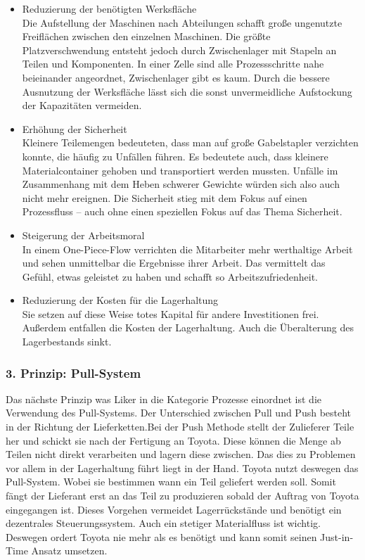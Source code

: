 \documentclass[a4paper,12pt]{scrartcl}
\begin{document}
\begin{itemize}
    \item Reduzierung der benötigten Werksfläche\\
    Die Aufstellung der Maschinen nach Abteilungen schafft große ungenutzte Freiflächen zwischen den einzelnen Maschinen. Die größte Platzverschwendung entsteht jedoch durch Zwischenlager mit Stapeln an Teilen und Komponenten. In einer Zelle sind alle Prozessschritte nahe beieinander angeordnet, Zwischenlager gibt es kaum. Durch die bessere Ausnutzung der Werksfläche lässt sich die sonst unvermeidliche Aufstockung der Kapazitäten vermeiden.
    \item Erhöhung der Sicherheit\\
    Kleinere Teilemengen bedeuteten, dass man auf große Gabelstapler verzichten konnte, die häufig zu Unfällen führen. Es bedeutete auch, dass kleinere Materialcontainer gehoben und transportiert werden mussten. Unfälle im Zusammenhang mit dem Heben schwerer Gewichte würden sich also auch nicht mehr ereignen. Die Sicherheit stieg mit dem Fokus auf einen Prozessfluss – auch ohne einen speziellen Fokus auf das Thema Sicherheit.
    \item Steigerung der Arbeitsmoral\\
    In einem One-Piece-Flow verrichten die Mitarbeiter mehr werthaltige Arbeit und sehen unmittelbar die Ergebnisse ihrer Arbeit. Das vermittelt das Gefühl, etwas geleistet zu haben und schafft so Arbeitszufriedenheit.
    \item Reduzierung der Kosten für die Lagerhaltung\\
    Sie setzen auf diese Weise totes Kapital für andere Investitionen frei. Außerdem entfallen die Kosten der Lagerhaltung. Auch die Überalterung des Lagerbestands sinkt.
\end{itemize}

\subsubsection{3. Prinzip: Pull-System}

Das nächste Prinzip was Liker in die Kategorie Prozesse einordnet ist die Verwendung des Pull-Systems. Der Unterschied zwischen Pull und Push besteht in der Richtung der Lieferketten.Bei der Push Methode stellt der Zulieferer Teile her und schickt sie nach der Fertigung an Toyota. Diese können die Menge ab Teilen nicht direkt verarbeiten und lagern diese zwischen. Das dies zu Problemen vor allem in der Lagerhaltung führt liegt in der Hand. Toyota nutzt deswegen das Pull-System. Wobei sie bestimmen wann ein Teil geliefert werden soll. Somit fängt der Lieferant erst an das Teil zu produzieren sobald der Auftrag von Toyota eingegangen ist. Dieses Vorgehen vermeidet Lagerrückstände und benötigt ein dezentrales Steuerungssystem. Auch ein stetiger Materialfluss ist wichtig. Deswegen ordert Toyota nie mehr als es benötigt und kann somit seinen Just-in-Time Ansatz umsetzen. 
\end{document}
